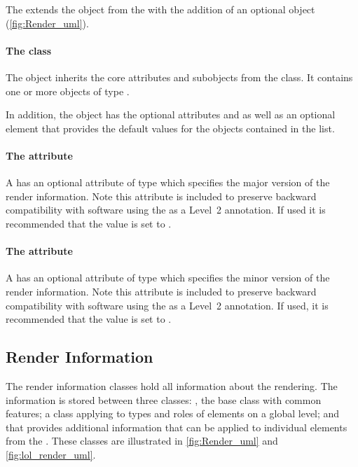 The \RenderPackage extends the  object from the \LayoutPackage with the addition
of an optional  \ListOfLocalRenderInformation object (\ref{fig:Render_uml}).

\paragraph{The  class}
\label{listoflocalrenderinformation-class}

The \ListOfLocalRenderInformation object inherits the core attributes and subobjects from the 
class. It contains one or more objects of type \LocalRenderInformation.

In addition, the \ListOfLocalRenderInformation object has the optional
attributes  and  as well as an optional
\DefaultValues element that provides the default values for the 
\LocalRenderInformation objects contained in the list.

\paragraph{The \fixttspace{} attribute}

A \ListOfLocalRenderInformation has an optional attribute
 of type  which specifies the major version of the render information.  Note this attribute is included to preserve backward compatibility with software using the \RenderPackage as a Level~2 annotation. If used it is recommended that the value is set to .
 
\paragraph{The \fixttspace{} attribute}

A \ListOfLocalRenderInformation has an optional attribute
 of type  which specifies the minor version of the render information.  Note this attribute is included to preserve backward compatibility with software using the \RenderPackage as a Level~2 annotation. If used, it is recommended that the value is set to .
 
\subsection{Render Information}
\label{renderinformation-class}
The render information classes hold all information about the rendering. The
information is stored between three classes: \RenderInformationBase, the base class with 
common features; \GlobalRenderInformation a class applying to types and roles of 
elements on a global level; and \LocalRenderInformation that provides additional information that can be applied to individual elements from the \LayoutPackage. These classes are illustrated in \ref{fig:Render_uml} and \ref{fig:lol_render_uml}.


